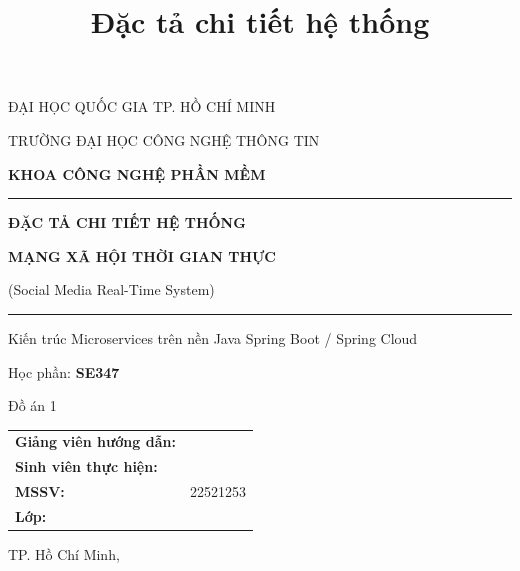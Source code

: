 \documentclass[12pt,a4paper]{report}
\title{\Huge\textbf{Đặc tả chi tiết hệ thống}}
\author{}
\date{}
\begin{document}
\begin{titlepage}
\centering
{\large ĐẠI HỌC QUỐC GIA TP. HỒ CHÍ MINH \par}
{\large TRƯỜNG ĐẠI HỌC CÔNG NGHỆ THÔNG TIN \par}
\vspace{0.3cm}
{\large \textbf{KHOA CÔNG NGHỆ PHẦN MỀM} \par} %

\vspace{2cm}
\rule{0.8\textwidth}{0.4pt}\par
\vspace{0.4cm}
{\Huge\bfseries ĐẶC TẢ CHI TIẾT HỆ THỐNG\par}
\vspace{0.4cm}
{\LARGE\bfseries MẠNG XÃ HỘI THỜI GIAN THỰC\par}
{\Large (Social Media Real-Time System)\par}
\vspace{0.4cm}
\rule{0.8\textwidth}{0.4pt}\par

\vspace{1.2cm}
{\large Kiến trúc Microservices trên nền Java Spring Boot / Spring Cloud\par}

\vspace{2cm}
{\large Học phần: \textbf{SE347} \par} %
{\large Đồ án 1 \par}

\vspace{2cm}
\begin{tabular}{ll}
\textbf{Giảng viên hướng dẫn:} & \underline{\hspace{6cm}} \\[0.6cm]
\textbf{Sinh viên thực hiện:} & \underline{\hspace{6cm}} \\[0.3cm]
\textbf{MSSV:} & 22521253 \\[0.6cm]
\textbf{Lớp:} & \underline{\hspace{6cm}} \\
\end{tabular}

\vfill
{\large TP. Hồ Chí Minh, \the\year\par}
\end{titlepage}
\end{document}
